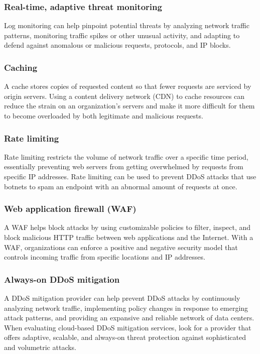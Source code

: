 \documentclass{ijitcs}
\begin{document}
\subsubsection{Real-time, adaptive threat monitoring}
Log monitoring can help pinpoint potential threats by analyzing network traffic patterns, monitoring traffic spikes or other unusual activity, and adapting to defend against anomalous or malicious requests, protocols, and IP blocks.
\subsubsection{Caching}
 A cache stores copies of requested content so that fewer requests are serviced by origin servers. Using a content delivery network (CDN) to cache resources can reduce the strain on an organization’s servers and make it more difficult for them to become overloaded by both legitimate and malicious requests.
\subsubsection{Rate limiting}
Rate limiting restricts the volume of network traffic over a specific time period, essentially preventing web servers from getting overwhelmed by requests from specific IP addresses. Rate limiting can be used to prevent DDoS attacks that use botnets to spam an endpoint with an abnormal amount of requests at once.
\subsubsection{Web application firewall (WAF)}
A WAF helps block attacks by using customizable policies to filter, inspect, and block malicious HTTP traffic between web applications and the Internet. With a WAF, organizations can enforce a positive and negative security model that controls incoming traffic from specific locations and IP addresses.
\subsubsection{Always-on DDoS mitigation}
A DDoS mitigation provider can help prevent DDoS attacks by continuously analyzing network traffic, implementing policy changes in response to emerging attack patterns, and providing an expansive and reliable network of data centers. When evaluating cloud-based DDoS mitigation services, look for a provider that offers adaptive, scalable, and always-on threat protection against sophisticated and volumetric attacks.
\end{document}

